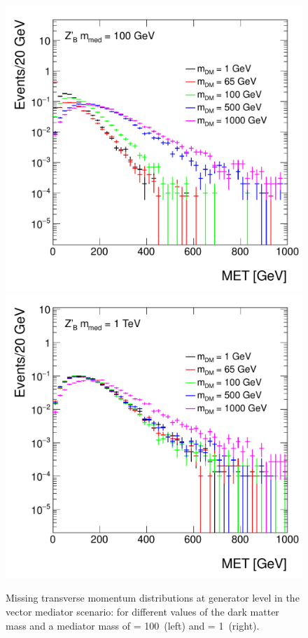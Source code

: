 \begin{figure}[htpb!]
	\includegraphics[width=0.75\linewidth]{figures/EW/monoH/zprime_100_MET_et_Log}\\
	\includegraphics[width=0.75\linewidth]{figures/EW/monoH/zprime_1000_MET_et_Log}
	\caption{Missing transverse momentum distributions at generator level in the vector 
		mediator scenario: for different values of the dark matter mass \mDM 
		and a mediator mass of \mmed = 100~\gev (left) and \mmed = 1~\tev (right).
		\label{fig:metVectorMass} }
\end{figure}


